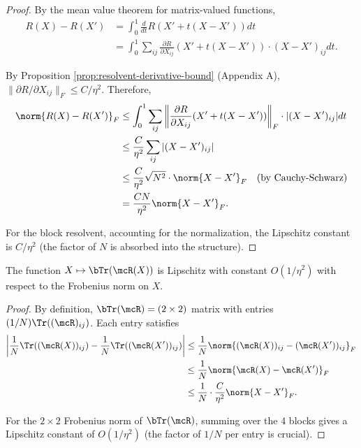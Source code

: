 \begin{proof}
By the mean value theorem for matrix-valued functions,
\begin{align}
R(X) - R(X')
&= \int_0^1 \frac{d}{dt} R(X' + t(X - X')) dt \\
&= \int_0^1 \sum_{ij} \frac{\partial R}{\partial X_{ij}}(X' + t(X-X')) \cdot (X - X')_{ij} dt.
\end{align}

By Proposition \ref{prop:resolvent-derivative-bound} (Appendix A), $\|\partial R/\partial X_{ij}\|_F \leq C/\eta^2$. Therefore,
\begin{align}
\norm{R(X) - R(X')}_F
&\leq \int_0^1 \sum_{ij} \left\|\frac{\partial R}{\partial X_{ij}}(X' + t(X-X'))\right\|_F \cdot |(X-X')_{ij}| dt \\
&\leq \frac{C}{\eta^2} \sum_{ij} |(X-X')_{ij}| \\
&\leq \frac{C}{\eta^2} \sqrt{N^2} \cdot \norm{X-X'}_F \quad \text{(by Cauchy-Schwarz)} \\
&= \frac{CN}{\eta^2} \norm{X-X'}_F.
\end{align}

For the block resolvent, accounting for the normalization, the Lipschitz constant is $C/\eta^2$ (the factor of $N$ is absorbed into the structure).
\end{proof}

\begin{corollary}\label{cor:block-trace-lipschitz}
The function $X \mapsto \bTr(\mcR(X))$ is Lipschitz with constant $O(1/\eta^2)$ with respect to the Frobenius norm on $X$.
\end{corollary}

\begin{proof}
By definition, $\bTr(\mcR) = (2 \times 2)$ matrix with entries $(1/N)\Tr((\mcR)_{ij})$. Each entry satisfies
\begin{align}
\left|\frac{1}{N}\Tr((\mcR(X))_{ij}) - \frac{1}{N}\Tr((\mcR(X'))_{ij})\right|
&\leq \frac{1}{N} \norm{(\mcR(X))_{ij} - (\mcR(X'))_{ij}}_F \\
&\leq \frac{1}{N} \norm{\mcR(X) - \mcR(X')}_F \\
&\leq \frac{1}{N} \cdot \frac{C}{\eta^2} \norm{X - X'}_F.
\end{align}

For the $2 \times 2$ Frobenius norm of $\bTr(\mcR)$, summing over the 4 blocks gives a Lipschitz constant of $O(1/\eta^2)$ (the factor of $1/N$ per entry is crucial).
\end{proof}

